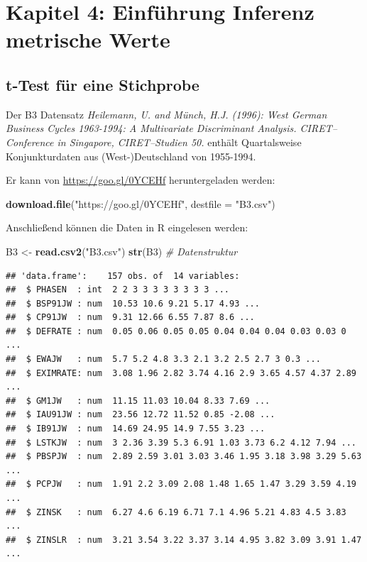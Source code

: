 \documentclass[12pt,ngerman,paper=a4,pagesize,DIV=13]{scrreprt}
\newenvironment{Shaded}{\begin{snugshade}}{\end{snugshade}}
\newcommand{\CommentTok}[1]{\textcolor[rgb]{0.56,0.35,0.01}{\textit{#1}}}
\newcommand{\DataTypeTok}[1]{\textcolor[rgb]{0.13,0.29,0.53}{#1}}
\newcommand{\KeywordTok}[1]{\textcolor[rgb]{0.13,0.29,0.53}{\textbf{#1}}}
\newcommand{\NormalTok}[1]{#1}
\newcommand{\StringTok}[1]{\textcolor[rgb]{0.31,0.60,0.02}{#1}}
\begin{document}
\hypertarget{kapitel-4-einfuhrung-inferenz-metrische-werte}{%
\chapter{Kapitel 4: Einführung Inferenz metrische
Werte}\label{kapitel-4-einfuhrung-inferenz-metrische-werte}}

\hypertarget{t-test-fur-eine-stichprobe}{%
\section{t-Test für eine Stichprobe}\label{t-test-fur-eine-stichprobe}}

Der B3 Datensatz \emph{Heilemann, U. and Münch, H.J. (1996): West German
Business Cycles 1963-1994: A Multivariate Discriminant Analysis.
CIRET--Conference in Singapore, CIRET--Studien 50.} enthält
Quartalsweise Konjunkturdaten aus (West-)Deutschland von 1955-1994.

Er kann von \url{https://goo.gl/0YCEHf} heruntergeladen werden:

\begin{Shaded}
\begin{Highlighting}[]
\KeywordTok{download.file}\NormalTok{(}\StringTok{"https://goo.gl/0YCEHf"}\NormalTok{, }\DataTypeTok{destfile =} \StringTok{"B3.csv"}\NormalTok{)}
\end{Highlighting}
\end{Shaded}

Anschließend können die Daten in R eingelesen werden:

\begin{Shaded}
\begin{Highlighting}[]
\NormalTok{B3 <-}\StringTok{ }\KeywordTok{read.csv2}\NormalTok{(}\StringTok{"B3.csv"}\NormalTok{)}
\KeywordTok{str}\NormalTok{(B3) }\CommentTok{# Datenstruktur}
\end{Highlighting}
\end{Shaded}

\begin{verbatim}
## 'data.frame':    157 obs. of  14 variables:
##  $ PHASEN  : int  2 2 3 3 3 3 3 3 3 3 ...
##  $ BSP91JW : num  10.53 10.6 9.21 5.17 4.93 ...
##  $ CP91JW  : num  9.31 12.66 6.55 7.87 8.6 ...
##  $ DEFRATE : num  0.05 0.06 0.05 0.05 0.04 0.04 0.04 0.03 0.03 0 ...
##  $ EWAJW   : num  5.7 5.2 4.8 3.3 2.1 3.2 2.5 2.7 3 0.3 ...
##  $ EXIMRATE: num  3.08 1.96 2.82 3.74 4.16 2.9 3.65 4.57 4.37 2.89 ...
##  $ GM1JW   : num  11.15 11.03 10.04 8.33 7.69 ...
##  $ IAU91JW : num  23.56 12.72 11.52 0.85 -2.08 ...
##  $ IB91JW  : num  14.69 24.95 14.9 7.55 3.23 ...
##  $ LSTKJW  : num  3 2.36 3.39 5.3 6.91 1.03 3.73 6.2 4.12 7.94 ...
##  $ PBSPJW  : num  2.89 2.59 3.01 3.03 3.46 1.95 3.18 3.98 3.29 5.63 ...
##  $ PCPJW   : num  1.91 2.2 3.09 2.08 1.48 1.65 1.47 3.29 3.59 4.19 ...
##  $ ZINSK   : num  6.27 4.6 6.19 6.71 7.1 4.96 5.21 4.83 4.5 3.83 ...
##  $ ZINSLR  : num  3.21 3.54 3.22 3.37 3.14 4.95 3.82 3.09 3.91 1.47 ...
\end{verbatim}
\end{document}
